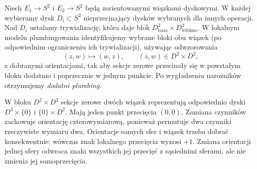 \begin{definicja}
Niech $E_1\to S^2$ i $E_2\to S^2$ będą zorientowanymi
wiązkami dyskowymi. W każdej wybieramy dysk $D_i\subset S^2$
nieprzecinający dysków wybranych dla innych operacji.
Nad $D_i$ ustalamy trywializację, która daje blok
$D^2_{\text{baza}}\times D^2_{\text{włókno}}$.
W lokalnym modelu plumbingowania identyfikujemy wybrane
bloki obu wiązek (po odpowiednim ograniczeniu ich
trywializacji), używając odwzorowania
\[
(z,w)\longmapsto(w,z), \qquad (z,w)\in D^2\times D^2,
\]
z dobranymi orientacjami, tak aby sekcje zerowe przecinały się
w powstałym bloku dodatnio i poprzecznie w jednym punkcie.
Po wygładzeniu narożników otrzymujemy \emph{dodatni plumbing}.
\end{definicja}

\begin{uwaga}
W bloku $D^2\times D^2$ sekcje zerowe dwóch wiązek
reprezentują odpowiednio dyski $D^2\times\{0\}$ i
$\{0\}\times D^2$. Mają jeden punkt przecięcia $(0,0)$.
Zamiana czynników zachowuje orientację czterowymiarową,
ponieważ permutuje dwa czynniki rzeczywiste wymiaru dwa.
Orientacje samych sfer i wiązek trzeba dobrać konsekwentnie:
wówczas znak lokalnego przecięcia wynosi $+1$. Zmiana
orientacji jednej sfery odwraca znaki wszystkich jej przecięć
z sąsiednimi sferami, ale nie zmienia jej samoprzecięcia.
\end{uwaga}

\begin{center}
\end{center}

